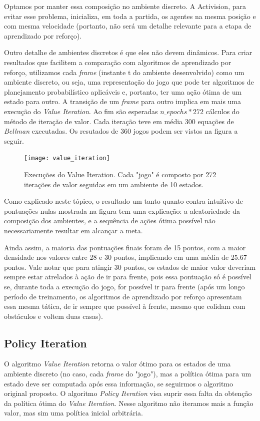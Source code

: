 \documentclass[letterpaper]{article} %
\begin{document}
Optamos por manter essa composição no ambiente discreto. A Activision, para evitar esse problema, inicializa, em toda a partida, os agentes na mesma posição e com mesma velocidade (portanto, não será um detalhe relevante para a etapa de aprendizado por reforço).

Outro detalhe de ambientes discretos é que eles não devem dinâmicos. Para criar resultados que facilitem a comparação com algoritmos de aprendizado por reforço, utilizamos cada \textit{frame} (instante t do ambiente desenvolvido) como um ambiente discreto, ou seja, uma representação do jogo que pode ter algoritmos de planejamento probabilístico aplicáveis e, portanto, ter uma ação ótima de um estado para outro. A transição de um \textit{frame} para outro implica em mais uma execução do \textit{Value Iteration}. Ao fim são esperadas $n\_epochs * 272$  cálculos do método de iteração de valor. Cada iteração teve em média 300 equações de \textit{Bellman} executadas. Os resutados de 360 jogos podem ser vistos na figura a seguir.

\begin{figure}[h]
	\center
	\texttt{[image: value\_iteration]}
    \caption{Execuções do Value Iteration. Cada "jogo" é composto por 272 iterações de valor seguidas em um ambiente de 10 estados.}
\end{figure}

Como explicado neste tópico, o resultado um tanto quanto contra intuitivo de pontuações nulas mostrada na figura tem uma explicação: a aleatoriedade da composição dos ambientes, e a sequência de ações ótima possível não necessariamente resultar em alcançar a meta.

Ainda assim, a maioria das pontuações finais foram de 15 pontos, com a maior densidade nos valores entre 28 e 30 pontos, implicando em uma média de 25.67 pontos. Vale notar que para atingir 30 pontos, os estados de maior valor deveriam sempre estar atrelados à ação de ir para frente, pois essa pontuação só é possível se, durante toda a execução do jogo, for possível ir para frente (após um longo período de treinamento, os algoritmos de aprendizado por reforço apresentam essa mesma tática, de ir sempre que possível à frente, mesmo que colidam com obstáculos e voltem duas casas).

\subsection{Policy Iteration}
O algoritmo \textit{Value Iteration} retorna o valor ótimo para os estados de uma ambiente discreto (no caso, cada \textit{frame} do "jogo"), mas a política ótima para um estado deve ser computada após essa informação, se seguirmos o algoritmo original proposto. O algoritmo \textit{Policy Iteration} visa suprir essa falta da obtenção da política ótima do \textit{Value Iteration}. Nesse algoritmo não iteramos mais a função valor, mas sim uma política inicial arbitrária.
\end{document}
